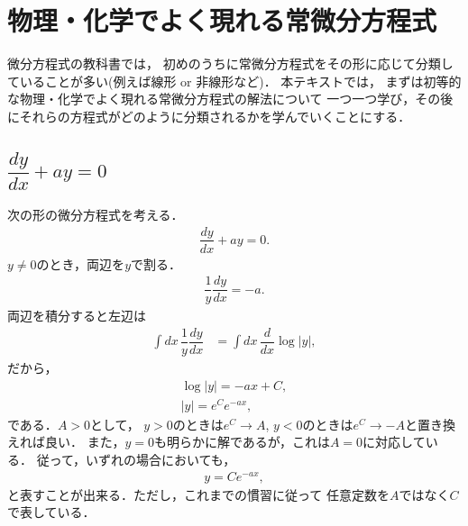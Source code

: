 \section{物理・化学でよく現れる常微分方程式}
%
微分方程式の教科書では，
初めのうちに常微分方程式をその形に応じて分類していることが多い(例えば線形 or 非線形など)．
本テキストでは，
まずは初等的な物理・化学でよく現れる常微分方程式の解法について
一つ一つ学び，その後にそれらの方程式がどのように分類されるかを学んでいくことにする．

\subsection{$\dfrac{dy}{dx} + a y = 0$\label{sec:PDE_02}}
%
次の形の微分方程式を考える．
\begin{align}
 \dfrac{dy}{dx} + a y = 0. \label{eq:PDE_02} 
\end{align}
$y\neq 0$のとき，両辺を$y$で割る．
\begin{align}
\dfrac{1}{y}\dfrac{dy}{dx} = -a. 
\end{align}
両辺を積分すると左辺は
\begin{align}
 \int dx\,\dfrac{1}{y}\dfrac{dy}{dx} 
 & = \int dx\,\dfrac{d}{dx}\log \left|y\right|, 
\end{align}
だから，
\begin{align}
\log \left| y \right| = -ax + C,\\
\left| y \right| = e^{C} e^{-ax}, 
\end{align}
である．$A>0$として，
$y> 0 $のときは$e^C \to A$, $y < 0$のときは$e^{C} \to -A$と置き換えれば良い．
また，$y=0$も明らかに解であるが，これは$A=0$に対応している．
従って，いずれの場合においても，
\begin{align}
 y = C e^{-ax}, 
\end{align}
と表すことが出来る．ただし，これまでの慣習に従って
任意定数を$A$ではなく$C$で表している．
 
%
